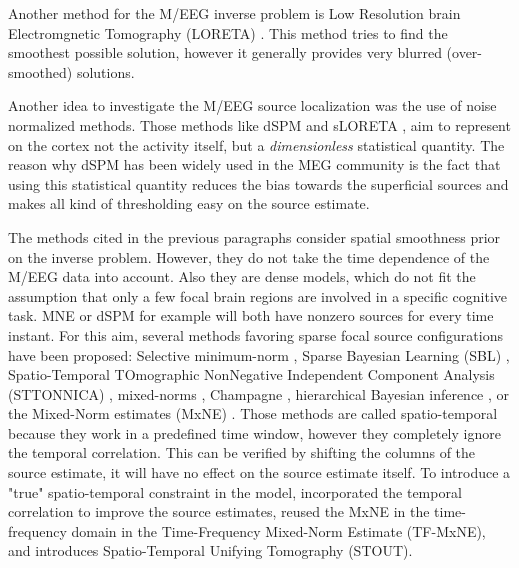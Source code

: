Another method for the M/EEG inverse problem is Low Resolution brain Electromgnetic Tomography (LORETA) \cite{pascual1994low}. This method tries to find the smoothest possible solution, however it generally provides very blurred (over-smoothed) solutions.

Another idea to investigate the M/EEG source localization was the use of noise normalized methods. Those methods like dSPM \cite{dale2000dynamic} and sLORETA \cite{pascual2002standardized}, aim to represent on the cortex not the activity itself, but a \textit{dimensionless} statistical quantity. The reason why dSPM has been widely used in the MEG community is the fact that using this statistical quantity reduces the bias towards the superficial sources and makes all kind of thresholding easy on the source estimate.

The methods cited in the previous paragraphs consider spatial smoothness prior on the inverse problem. However, they do not take the time dependence of the M/EEG data into account. Also they are dense models, which do not fit the assumption that only a few focal brain regions are involved in a specific cognitive task. MNE or dSPM for example will both have nonzero sources for every time instant.
For this aim, several methods favoring sparse focal source configurations have been proposed: Selective minimum-norm \cite{matsuura1995selective}, Sparse Bayesian Learning (SBL) \cite{wipf2006bayesian}, Spatio-Temporal TOmographic NonNegative Independent Component Analysis (STTONNICA) \cite{valdes2009eeg}, mixed-norms \cite{ou2009distributed}, Champagne \cite{owen2012performance}, hierarchical Bayesian inference  \cite{lucka2012hierarchical}, or the Mixed-Norm estimates (MxNE) \cite{gramfort2012mixed}. Those methods are called spatio-temporal because they work in a predefined time window, however they completely ignore the temporal correlation. This can be verified by shifting the columns of the source estimate, it will have no effect on the source estimate itself. To introduce a "true" spatio-temporal constraint in the model, \cite{zhang2011sparse,zhang2011iterative} incorporated the temporal correlation to improve the source estimates, \cite{gramfort2013time} reused the MxNE in the time-frequency domain in the Time-Frequency Mixed-Norm Estimate (TF-MxNE), and \cite{castano2015solving} introduces Spatio-Temporal Unifying Tomography (STOUT).

